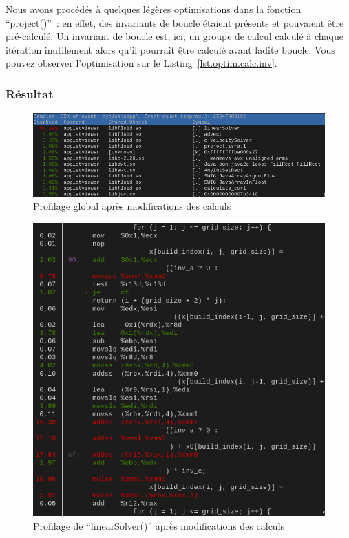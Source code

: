 \documentclass[12pt,a4paper]{article}
\begin{document}
Nous avons procédés à quelques légères optimisations dans la fonction
\enquote{project()} : en effet, des invariants de boucle étaient présents et
pouvaient être pré-calculé. Un invariant de boucle est, ici, un groupe de calcul
calculé à chaque itération inutilement alors qu'il pourrait être calculé avant
ladite boucle. Vous pouvez observer l'optimisation sur le
Listing~\ref{lst.optim.calc.inv}.

\subsubsection{Résultat}
\label{sec.optim.calc.res}

\begin{figure}
    \centering
    \includegraphics[scale=0.55]{figures/optims/computing/global.png}
    \caption{Profilage global après modifications des calculs}
    \label{fig.optim.calc.global}
\end{figure}

\begin{figure}
    \centering
    \includegraphics[scale=0.55]{figures/optims/computing/linearSolver.png}
    \caption{Profilage de \enquote{linearSolver()} après modifications des calculs}
    \label{fig.optim.calc.linearSolver}
\end{figure}
\end{document}
